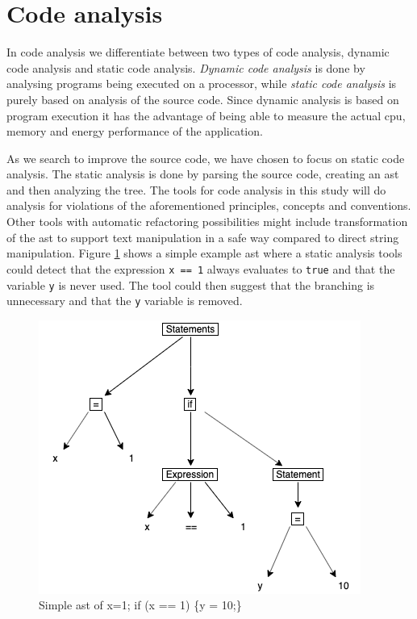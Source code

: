 \documentclass{report}
\begin{document}
\section{Code analysis}
In code analysis we differentiate between two types of code analysis, dynamic code analysis and static code analysis. \textit{Dynamic code analysis} is done by analysing programs being executed on a processor, while \textit{static code analysis} is purely based on analysis of the source code. Since dynamic analysis is based on program execution it has the advantage of being able to measure the actual \gls{cpu}, memory and energy performance of the application. 

As we search to improve the source code, we have chosen to focus on static code analysis. The static analysis is done by parsing the source code, creating an \gls{ast} and then analyzing the tree. The tools for code analysis in this study will do analysis for violations of the aforementioned principles, concepts and conventions. Other tools with automatic refactoring possibilities might include transformation of the \gls{ast} to support text manipulation in a safe way compared to direct string manipulation. Figure \ref{fig:ast} shows a simple example \gls{ast} where a static analysis tools could detect that the expression \texttt{x == 1} always evaluates to \texttt{true} and that the variable \texttt{y} is never used. The tool could then suggest that the branching is unnecessary and that the \texttt{y} variable is removed.  

\begin{figure}[h!]
	\centering
	\includegraphics[width=\linewidth/2]{report/images/ast.png}
	\caption{Simple \gls{ast} of x=1; if (x == 1) \{y = 10;\}}
	\label{fig:ast}
\end{figure}
\end{document}
